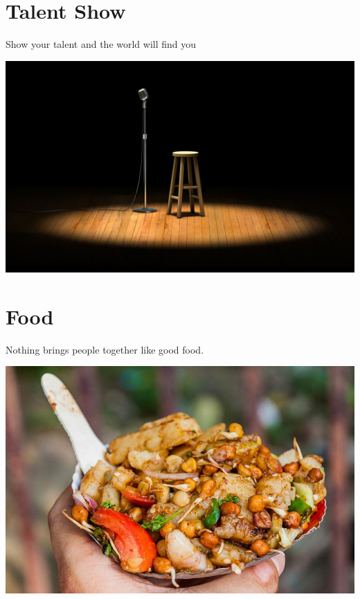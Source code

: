 \documentclass[makeidx, 11pt, oneside, onecolumn, openright, final, svgnames, dvipsnames, extrafontsizes]{memoir}
\begin{document}
\chapter{Talent Show}
\thispagestyle{empty}

\begin{center}
Show your talent and the world will find you
\end{center}
\begin{center}
\includegraphics[scale=1]{talent.jpg}
\end{center}



\chapter{Food}
\thispagestyle{empty}
\begin{center}
Nothing brings people together like good food. %
\end{center}
\begin{center}
\includegraphics[scale=1]{food.jpg}
\end{center}
\end{document}
